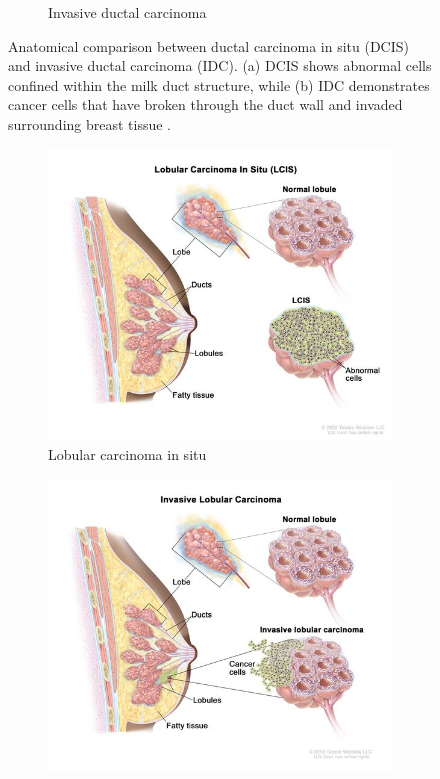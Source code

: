 \documentclass[a4paper,10pt]{book}
\begin{document}
\begin{figure}[h!]
\begin{subfigure}[c]{0.48\textwidth}
		\caption{Invasive ductal carcinoma}
		\label{fig:idc}
	\end{subfigure}
	\caption{Anatomical comparison between ductal carcinoma in situ (DCIS) and invasive ductal carcinoma (IDC). (a) DCIS shows abnormal cells confined within the milk duct structure, while (b) IDC demonstrates cancer cells that have broken through the duct wall and invaded surrounding breast tissue \cite{noauthor_nci_2011}.}
	\label{fig:histological_types_one}
\end{figure}

\begin{figure}[h!]
	\centering
	\begin{subfigure}[c]{0.48\textwidth}
		\centering
		\includegraphics[width=\textwidth]{reports/assets/lcis.jpg}
		\caption{Lobular carcinoma in situ}
		\label{fig:lcis}
	\end{subfigure}
	\begin{subfigure}[c]{0.48\textwidth}
		\centering
		\includegraphics[width=\textwidth]{reports/assets/ilc.jpg}

\end{subfigure}
\end{figure}
\end{document}

